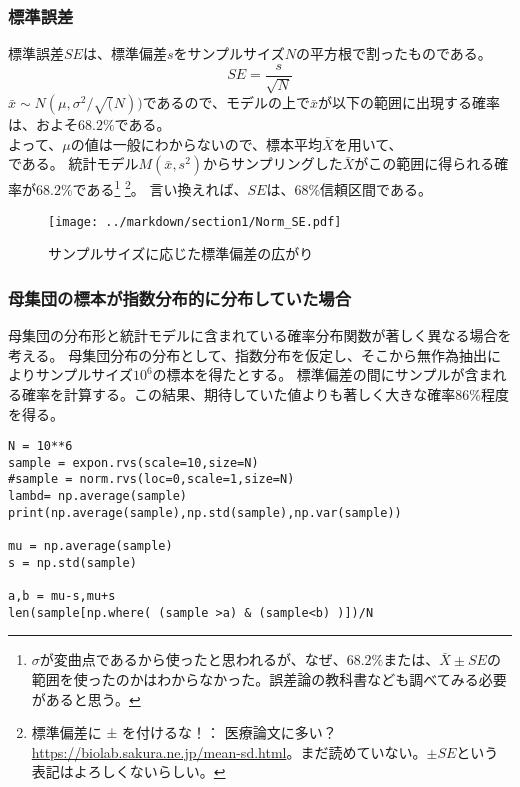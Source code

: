 \documentclass[a4paper,11pt,dvipdfmx]{jsarticle}
\begin{document}
\subsubsection{標準誤差}
標準誤差$SE$は、標準偏差$s$をサンプルサイズ$N$の平方根で割ったものである。
\begin{equation*}
    SE = \frac{s}{\sqrt{N}}
\end{equation*}
$\bar{x}\sim N(\mu,\sigma^2/\sqrt(N))$であるので、モデルの上で$\bar{x}$が以下の範囲に出現する確率は、およそ$68.2\%$である。
\begin{equation*}
    [\bar{\mu}-SE,\bar{\mu}+SE]
\end{equation*}
よって、$\mu$の値は一般にわからないので、標本平均$\bar{X}$を用いて、
\begin{equation*}
    [\bar{X}-SE,\bar{X}+SE]
\end{equation*}
である。
統計モデル$M(\bar{x},s^2)$からサンプリングした$\bar{X}$がこの範囲に得られる確率が$68.2\%$である\footnote{$\sigma$が変曲点であるから使ったと思われるが、なぜ、$68.2\%$または、$\bar{X}\pm SE$の範囲を使ったのかはわからなかった。誤差論の教科書なども調べてみる必要があると思う。}
\footnote{標準偏差に ± を付けるな！： 医療論文に多い？
\url{https://biolab.sakura.ne.jp/mean-sd.html}。まだ読めていない。$\pm SE$という表記はよろしくないらしい。}。
言い換えれば、$SE$は、$68\%$信頼区間である。


\begin{figure}
    \begin{center}
        \texttt{[image: ../markdown/section1/Norm\_SE.pdf]}
        \caption{サンプルサイズに応じた標準偏差の広がり}
    \end{center}
\end{figure}
    
\subsubsection{母集団の標本が指数分布的に分布していた場合}
母集団の分布形と統計モデルに含まれている確率分布関数が著しく異なる場合を考える。
母集団分布の分布として、指数分布を仮定し、そこから無作為抽出によりサンプルサイズ$10^6$の標本を得たとする。
標準偏差の間にサンプルが含まれる確率を計算する。この結果、期待していた値よりも著しく大きな確率$86\%$程度を得る。

\begin{lstlisting}
N = 10**6
sample = expon.rvs(scale=10,size=N)
#sample = norm.rvs(loc=0,scale=1,size=N)
lambd= np.average(sample)
print(np.average(sample),np.std(sample),np.var(sample))

mu = np.average(sample)
s = np.std(sample)

a,b = mu-s,mu+s
len(sample[np.where( (sample >a) & (sample<b) )])/N
\end{lstlisting}
\end{document}
